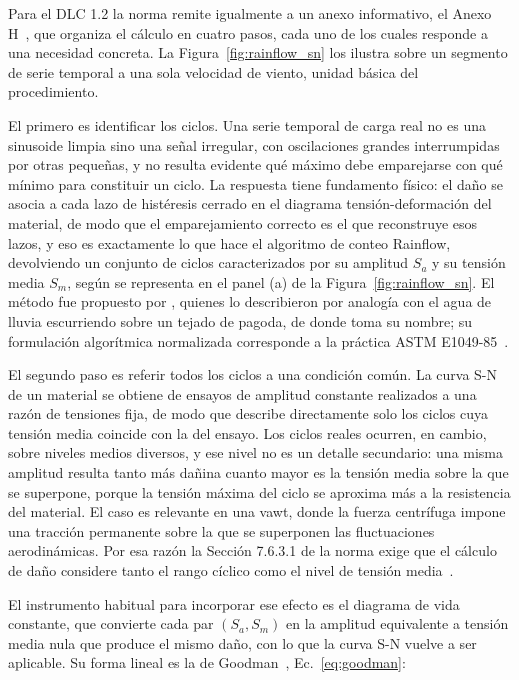 Para el DLC 1.2 la norma remite igualmente a un anexo informativo, el Anexo H~\parencite{IEC61400-1}, que organiza el cálculo en cuatro pasos, cada uno de los cuales responde a una necesidad concreta. La Figura~\ref{fig:rainflow_sn} los ilustra sobre un segmento de serie temporal a una sola velocidad de viento, unidad básica del procedimiento.

El primero es identificar los ciclos. Una serie temporal de carga real no es una sinusoide limpia sino una señal irregular, con oscilaciones grandes interrumpidas por otras pequeñas, y no resulta evidente qué máximo debe emparejarse con qué mínimo para constituir un ciclo. La respuesta tiene fundamento físico: el daño se asocia a cada lazo de histéresis cerrado en el diagrama tensión-deformación del material, de modo que el emparejamiento correcto es el que reconstruye esos lazos, y eso es exactamente lo que hace el algoritmo de conteo Rainflow, devolviendo un conjunto de ciclos caracterizados por su amplitud $S_a$ y su tensión media $S_m$, según se representa en el panel (a) de la Figura~\ref{fig:rainflow_sn}. El método fue propuesto por \textcite{Matsuishi1968}, quienes lo describieron por analogía con el agua de lluvia escurriendo sobre un tejado de pagoda, de donde toma su nombre; su formulación algorítmica normalizada corresponde a la práctica ASTM E1049-85~\parencite{ASTM_E1049}.

El segundo paso es referir todos los ciclos a una condición común. La curva S-N de un material se obtiene de ensayos de amplitud constante realizados a una razón de tensiones fija, de modo que describe directamente solo los ciclos cuya tensión media coincide con la del ensayo. Los ciclos reales ocurren, en cambio, sobre niveles medios diversos, y ese nivel no es un detalle secundario: una misma amplitud resulta tanto más dañina cuanto mayor es la tensión media sobre la que se superpone, porque la tensión máxima del ciclo se aproxima más a la resistencia del material. El caso es relevante en una \gls{vawt}, donde la fuerza centrífuga impone una tracción permanente sobre la que se superponen las fluctuaciones aerodinámicas. Por esa razón la Sección 7.6.3.1 de la norma exige que el cálculo de daño considere tanto el rango cíclico como el nivel de tensión media~\parencite{IEC61400-1}.

El instrumento habitual para incorporar ese efecto es el diagrama de vida constante, que convierte cada par $(S_a, S_m)$ en la amplitud equivalente a tensión media nula que produce el mismo daño, con lo que la curva S-N vuelve a ser aplicable. Su forma lineal es la de Goodman~\parencite{Goodman1899}, Ec.~\ref{eq:goodman}:


